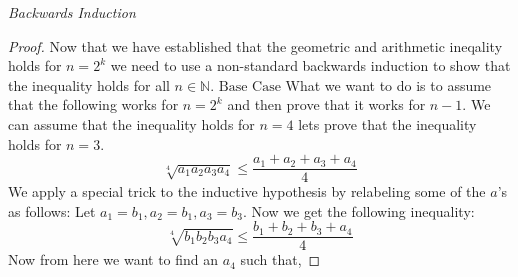 \documentclass[12pt]{extreport}
\begin{document}
\begin{flushleft}
\textit{Backwards Induction}
\begin{proof}
Now that we have established that the geometric and arithmetic ineqality holds for $n = 2^k$ we need to use a non-standard backwards induction to show that the inequality holds for all $n \in \mathbb{N}$.
\newline
\newline
$\boxed{\text{Base Case}}$ What we want to do is to assume that the following works for $n = 2^k$ and then prove that it works for $n - 1$. We can assume that the inequality holds for $n = 4$ lets prove that the inequality holds for $n = 3$. $$\sqrt[4]{a_1a_2a_3a_4} \leq \frac{a_1 + a_2 + a_3 + a_4}{4}$$ We apply a special trick to the inductive hypothesis by relabeling some of the $a$'s as follows: Let $a_1 = b_1, a_2 = b_1, a_3 = b_3$. Now we get the following inequality: $$\sqrt[4]{b_1b_2b_3a_4} \leq\frac{b_1 + b_2 + b_3 + a_4}{4}$$ Now from here we want to find an $a_4$ such that,


\end{proof}
\end{flushleft}
\end{document}
